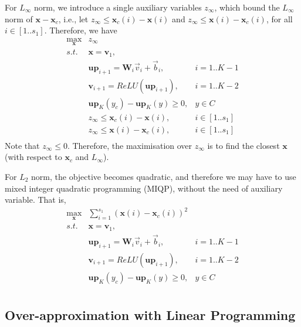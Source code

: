 For $L_\infty$ norm, we introduce a single auxiliary variables $z_\infty$, which bound the $L_\infty$ norm of $\textbf{x} - \textbf{x}_c$, i.e., let $z_\infty \leq \textbf{x}_c(i) - \textbf{x}(i)$ and $z_\infty \leq \textbf{x}(i) - \textbf{x}_c (i)$, for all $i\in [1..s_1]$. Therefore, we have 
\begin{equation}
\begin{array}{rll}
  \displaystyle\max_{\textbf{x}}  &   \displaystyle  z_\infty & \\
    s.t. &  \textbf{x} = \textbf{v}_1, & \\
    & \textbf{up}_{i+1} =  \textbf{W}_i \vec{v}_{i} + \vec{b}_i, & i = 1..K-1\\
    & \textbf{v}_{i+1} = ReLU(\textbf{up}_{i+1}),  & i = 1..K-2 \\
    &  \textbf{up}_{K}(y_c) - \textbf{up}_{K}(y)\geq 0,  & y\in C \\
    & z_\infty \leq \textbf{x}_c(i) - \textbf{x}(i), & i\in [1..s_1] \\
    & z_\infty \leq \textbf{x}(i) - \textbf{x}_c (i), & i\in [1..s_1] \\
\end{array}
\end{equation}
Note that $z_\infty\leq 0$. Therefore, the maximisation over $z_\infty$ is to find the closest $\textbf{x}$ (with respect to $\textbf{x}_c$ and $L_\infty$). 

For $L_2$ norm, the objective becomes quadratic, and therefore we may have to use mixed integer quadratic programming (MIQP), without the need of auxiliary variable. That is, 
\begin{equation}
\begin{array}{rll}
  \displaystyle\max_{\textbf{x}}  &   \displaystyle  \sum_{i=1}^{s_1} (\textbf{x}(i)-\textbf{x}_c(i))^2 & \\
    s.t. &  \textbf{x} = \textbf{v}_1, & \\
    & \textbf{up}_{i+1} =  \textbf{W}_i \vec{v}_{i} + \vec{b}_i, & i = 1..K-1\\
    & \textbf{v}_{i+1} = ReLU(\textbf{up}_{i+1}),  & i = 1..K-2 \\
    &  \textbf{up}_{K}(y_c) - \textbf{up}_{K}(y)\geq 0,  & y\in C \\
\end{array}
\end{equation}


\subsection{Over-approximation with Linear Programming}

